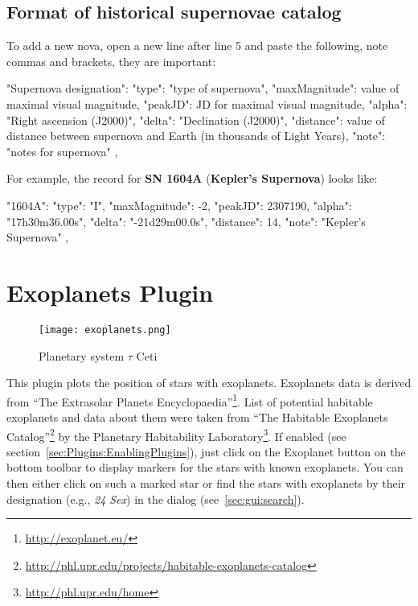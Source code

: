 \newpage
\subsection{Format of historical supernovae catalog}
\label{sec:plugins:HistoricalSupernovae:format}

To add a new nova, open a new line after line 5 and paste the following, note commas and brackets, they are important:

\begin{configfile}
"Supernova designation":
{
    "type": "type of supernova",
    "maxMagnitude": value of maximal visual magnitude,
    "peakJD": JD for maximal visual magnitude,
    "alpha": "Right ascension (J2000)",
    "delta": "Declination (J2000)",
    "distance": value of distance between supernova and 
                Earth (in thousands of Light Years),
    "note": "notes for supernova"
},
\end{configfile}

\noindent For example, the record for \textbf{SN 1604A} (\textbf{Kepler's Supernova}) looks like:
\begin{configfile}
"1604A":
{
    "type": "I",
    "maxMagnitude": -2,
    "peakJD": 2307190,
    "alpha": "17h30m36.00s",
    "delta": "-21d29m00.0s",
    "distance": 14,
    "note": "Kepler's Supernova"
},
\end{configfile}

\newpage

\section{Exoplanets Plugin}
\label{sec:plugins:Exoplanets}

\begin{figure}[h]
\texttt{[image: exoplanets.png]}
\caption{Planetary system $\tau$ Ceti}
\label{fig:Exoplanets}
\end{figure}

\noindent This plugin plots the position of stars with
exoplanets. Exoplanets data is derived from ``The Extrasolar Planets
Encyclopaedia''\footnote{\url{http://exoplanet.eu/}}. List of
potential habitable exoplanets and data about them were taken from
``The Habitable Exoplanets
Catalog''\footnote{\url{http://phl.upr.edu/projects/habitable-exoplanets-catalog}}
by the Planetary Habitability
Laboratory\footnote{\url{http://phl.upr.edu/home}}.  If enabled (see
section~\ref{sec:Plugins:EnablingPlugins}), just click on the
Exoplanet button  on the bottom
toolbar to display markers for the stars with known exoplanets. You
can then either click on such a marked star or find the stars with
exoplanets by their designation (e.g., \emph{24 Sex}) in the  dialog (see~\ref{sec:gui:search}).


